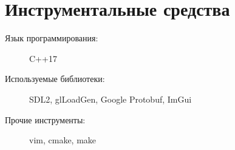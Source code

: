 \section{Инструментальные средства}
\begin{description}
    \item[Язык программирования:] C++17
    \item[Используемые библиотеки:] SDL2, glLoadGen, Google Protobuf, ImGui
    \item[Прочие инструменты:] vim, cmake, make
\end{description}
